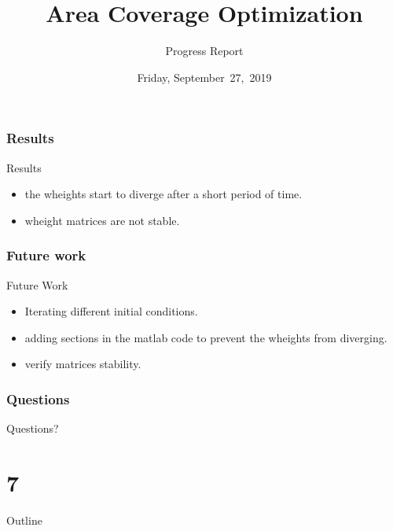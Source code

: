 \documentclass{beamer}
\begin{document}
\section{Results}
\begin{frame}{Results}
\begin{itemize}
\item the wheights start to diverge after a short period of time.
\item wheight matrices are not stable.
\end{itemize}
\end{frame}

\section{Future work}
\begin{frame}{Future Work}
\begin{itemize}
\item Iterating different initial conditions.
\item adding sections in the matlab code to prevent the wheights from diverging.
\item verify matrices stability.
\end{itemize}
\end{frame}

\section*{Questions}
\begin{frame}
\begin{LARGE}
\begin{center}
Questions?
\end{center}
\end{LARGE}
\end{frame}
\part{7}
\title{Area Coverage Optimization}
\subtitle{Progress Report}
\date[Sep~27,~2019]{Friday, September~27,~2019}
\begin{frame}
\maketitle
\end{frame}
\begin{frame}{Outline}
  \tableofcontents
  \end{frame}
\end{document}
